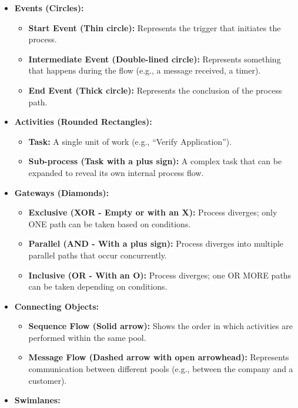 \documentclass[
  11pt,
  openany,
  oneside]{book}
\providecommand{\tightlist}{%
  \setlength{\itemsep}{0pt}\setlength{\parskip}{0pt}}
\begin{document}
\begin{itemize}
\tightlist
\item
  \textbf{Events (Circles):}

  \begin{itemize}
  \tightlist
  \item
    \textbf{Start Event (Thin circle):} Represents the trigger that
    initiates the process.
  \item
    \textbf{Intermediate Event (Double-lined circle):} Represents
    something that happens during the flow (e.g., a message received, a
    timer).
  \item
    \textbf{End Event (Thick circle):} Represents the conclusion of the
    process path.
  \end{itemize}
\item
  \textbf{Activities (Rounded Rectangles):}

  \begin{itemize}
  \tightlist
  \item
    \textbf{Task:} A single unit of work (e.g., ``Verify Application'').
  \item
    \textbf{Sub-process (Task with a plus sign):} A complex task that
    can be expanded to reveal its own internal process flow.
  \end{itemize}
\item
  \textbf{Gateways (Diamonds):}

  \begin{itemize}
  \tightlist
  \item
    \textbf{Exclusive (XOR - Empty or with an X):} Process diverges;
    only ONE path can be taken based on conditions.
  \item
    \textbf{Parallel (AND - With a plus sign):} Process diverges into
    multiple parallel paths that occur concurrently.
  \item
    \textbf{Inclusive (OR - With an O):} Process diverges; one OR MORE
    paths can be taken depending on conditions.
  \end{itemize}
\item
  \textbf{Connecting Objects:}

  \begin{itemize}
  \tightlist
  \item
    \textbf{Sequence Flow (Solid arrow):} Shows the order in which
    activities are performed within the same pool.
  \item
    \textbf{Message Flow (Dashed arrow with open arrowhead):} Represents
    communication between different pools (e.g., between the company and
    a customer).
  \end{itemize}
\item
  \textbf{Swimlanes:}


\end{itemize}
\end{document}
